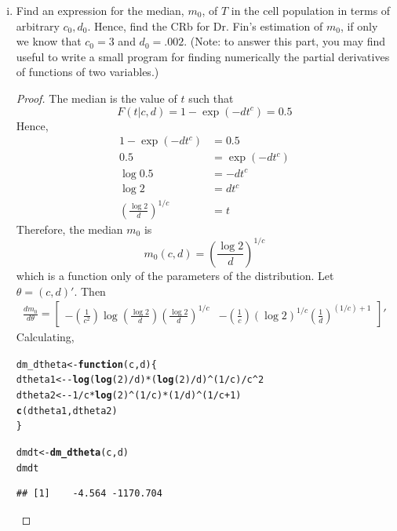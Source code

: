 \documentclass[letterpaper, 12pt]{article}\usepackage[]{graphicx}\usepackage[]{color}
\makeatletter
\newcommand{\hlnum}[1]{\textcolor[rgb]{0.686,0.059,0.569}{#1}}%
\newcommand{\hlopt}[1]{\textcolor[rgb]{0,0,0}{#1}}%
\newcommand{\hlstd}[1]{\textcolor[rgb]{0.345,0.345,0.345}{#1}}%
\newcommand{\hlkwa}[1]{\textcolor[rgb]{0.161,0.373,0.58}{\textbf{#1}}}%
\newcommand{\hlkwb}[1]{\textcolor[rgb]{0.69,0.353,0.396}{#1}}%
\newcommand{\hlkwc}[1]{\textcolor[rgb]{0.333,0.667,0.333}{#1}}%
\newcommand{\hlkwd}[1]{\textcolor[rgb]{0.737,0.353,0.396}{\textbf{#1}}}%
\newenvironment{kframe}{%
 \def\at@end@of@kframe{}%
 \ifinner\ifhmode%
  \def\at@end@of@kframe{\end{minipage}}%
  \begin{minipage}{\columnwidth}%
 \fi\fi%
 \def\FrameCommand##1{\hskip\@totalleftmargin \hskip-\fboxsep
 \colorbox{shadecolor}{##1}\hskip-\fboxsep
     \hskip-\linewidth \hskip-\@totalleftmargin \hskip\columnwidth}%
 \MakeFramed {\advance\hsize-\width
   \@totalleftmargin\z@ \linewidth\hsize
   \@setminipage}}%
 {\par\unskip\endMakeFramed%
 \at@end@of@kframe}
\newenvironment{knitrout}{}{} %
\makeatother
\begin{document}
\begin{enumerate}[(i)]
\item
Find an expression for the median, $m_0$, of $T$ in the cell population in terms of arbitrary $c_0, d_0$. Hence,
find the CRb for Dr. Fin’s estimation of $m_0$, if only we know that $c_0 = 3$ and $d_0 = .002$. (Note: to answer
this part, you may find useful to write a small program for finding numerically the partial derivatives of
functions of two variables.)

\begin{proof}
The median is the value of $t$ such that 
\[
F(t|c,d) = 1 - \exp(-dt^c) = 0.5
\]
Hence,
\begin{align*}
1 - \exp(-dt^c) &= 0.5 \\
0.5 &= \exp(-dt^c) \\
\log 0.5 &= -dt^c \\
\log 2 &= dt^c \\
\left(\frac{\log 2}{d}\right)^{1/c} &= t
\end{align*}
Therefore, the median $m_0$ is
\[
m_0(c,d) = \left(\frac{\log 2}{d}\right)^{1/c}
\]
which is a function only of the parameters of the distribution. Let $\theta = (c,d)'$. Then 
\begin{align*}
\frac{d m_0}{d \theta} = \begin{bmatrix}
-
\left(
\frac{1}{c^2}
\right)
\log
\left(
\frac{\log 2}{d}
\right)
\left(
\frac{\log 2}{d}
\right)^{1/c}
&
-
\left(
\frac{1}{c}
\right)
(\log 2)^{1/c}
\left(
\frac{1}{d}
\right)^{(1/c) + 1}
\end{bmatrix}'
\end{align*}
Calculating,
\begin{knitrout}
\color{fgcolor}\begin{kframe}
\begin{alltt}
\hlstd{dm_dtheta} \hlkwb{<-} \hlkwa{function}\hlstd{(}\hlkwc{c}\hlstd{,} \hlkwc{d}\hlstd{) \{}
    \hlstd{dtheta1} \hlkwb{<-} \hlopt{-}\hlkwd{log}\hlstd{(}\hlkwd{log}\hlstd{(}\hlnum{2}\hlstd{)}\hlopt{/}\hlstd{d)} \hlopt{*} \hlstd{(}\hlkwd{log}\hlstd{(}\hlnum{2}\hlstd{)}\hlopt{/}\hlstd{d)}\hlopt{^}\hlstd{(}\hlnum{1}\hlopt{/}\hlstd{c)}\hlopt{/}\hlstd{c}\hlopt{^}\hlnum{2}
    \hlstd{dtheta2} \hlkwb{<-} \hlopt{-}\hlnum{1}\hlopt{/}\hlstd{c} \hlopt{*} \hlkwd{log}\hlstd{(}\hlnum{2}\hlstd{)}\hlopt{^}\hlstd{(}\hlnum{1}\hlopt{/}\hlstd{c)} \hlopt{*} \hlstd{(}\hlnum{1}\hlopt{/}\hlstd{d)}\hlopt{^}\hlstd{(}\hlnum{1}\hlopt{/}\hlstd{c} \hlopt{+} \hlnum{1}\hlstd{)}
    \hlkwd{c}\hlstd{(dtheta1, dtheta2)}
\hlstd{\}}

\hlstd{dmdt} \hlkwb{<-} \hlkwd{dm_dtheta}\hlstd{(c, d)}
\hlstd{dmdt}
\end{alltt}
\begin{verbatim}
## [1]    -4.564 -1170.704
\end{verbatim}
\end{kframe}
\end{knitrout}


\end{proof}
\end{enumerate}
\end{document}
